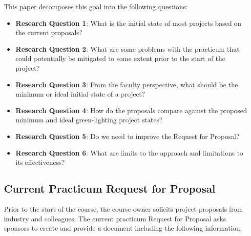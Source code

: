 \documentclass[conference]{IEEEtran}
\begin{document}
This paper decomposes this goal into the following questions:


\begin{itemize}
\itemsep1pt\parskip0pt
\item
  \textbf{Research Question 1}: What is the initial state of most projects
  based on the current proposals?
\item
  \textbf{Research Question 2}: What are some problems with the practicum that could potentially be mitigated to some extent prior to the start of the project?
\item
  \textbf{Research Question 3}: From the faculty perspective, what should be
  the minimum or ideal initial state of a project?
\item
  \textbf{Research Question 4}: How do the proposals compare against the
  proposed minimum and ideal green-lighting project states?
\item
  \textbf{Research Question 5}: Do we need to improve the Request for
  Proposal?
\item
  \textbf{Research Question 6}: What are limits to the approach and
  limitations to its effectiveness?
\end{itemize}


\subsection{Current Practicum Request for Proposal}
\label{ProposalQuestions}

Prior to the start of the course, the course owner solicits project
proposals from industry and colleagues. The current practicum Request
for Proposal asks sponsors to create and provide a document including
the following information:
\end{document}
